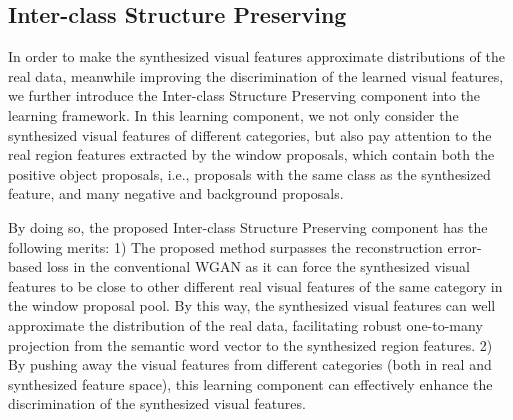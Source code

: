 \documentclass[10pt,twocolumn,letterpaper]{article}
\begin{document}
\subsection{Inter-class Structure Preserving}
In order to make the synthesized visual features approximate distributions of the real data, meanwhile improving the discrimination of the learned visual features, we further introduce the Inter-class Structure Preserving component into the learning framework. In this learning component, we not only consider the synthesized visual features of different categories, but also pay attention to the real region features extracted by the window proposals, which contain both the positive object proposals, i.e., proposals with the same class as the synthesized feature, and many negative and background proposals.

By doing so, the proposed Inter-class Structure Preserving component has the following merits: 1) The proposed method surpasses the reconstruction error-based loss in the conventional WGAN as it can force the synthesized visual features to be close to other different real visual features of the same category in the window proposal pool. By this way, the synthesized visual features can well approximate the distribution of the real data, facilitating robust one-to-many projection from the semantic word vector to the synthesized region features. 2) By pushing away the visual features from different categories (both in real and synthesized feature space), this learning component can effectively enhance the discrimination of the synthesized visual features.
\end{document}
